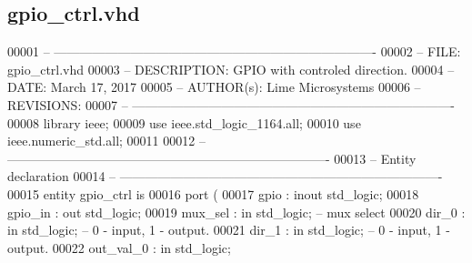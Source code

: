 \subsection{gpio\+\_\+ctrl.\+vhd}
\label{gpio__ctrl_8vhd_source}

\begin{DoxyCode}
00001 \textcolor{keyword}{-- ---------------------------------------------------------------------------- }
00002 \textcolor{keyword}{-- FILE:    gpio\_ctrl.vhd}
00003 \textcolor{keyword}{-- DESCRIPTION: GPIO with controled direction. }
00004 \textcolor{keyword}{-- DATE:    March 17, 2017}
00005 \textcolor{keyword}{-- AUTHOR(s):   Lime Microsystems}
00006 \textcolor{keyword}{-- REVISIONS:}
00007 \textcolor{keyword}{-- ---------------------------------------------------------------------------- }
00008 \textcolor{vhdlkeyword}{library }\textcolor{keywordflow}{ieee};
00009 \textcolor{vhdlkeyword}{use }ieee.std\_logic\_1164.\textcolor{keywordflow}{all};
00010 \textcolor{vhdlkeyword}{use }ieee.numeric\_std.\textcolor{keywordflow}{all};
00011 
00012 \textcolor{keyword}{-- ----------------------------------------------------------------------------}
00013 \textcolor{keyword}{-- Entity declaration}
00014 \textcolor{keyword}{-- ----------------------------------------------------------------------------}
00015 \textcolor{keywordflow}{entity }gpio_ctrl \textcolor{keywordflow}{is}
00016     \textcolor{keywordflow}{port} \textcolor{vhdlchar}{(}
00017         \textcolor{vhdlchar}{gpio}        \textcolor{vhdlchar}{:} \textcolor{keywordflow}{inout} \textcolor{comment}{std\_logic};
00018         \textcolor{vhdlchar}{gpio_in}     \textcolor{vhdlchar}{:} \textcolor{keywordflow}{out} \textcolor{comment}{std\_logic};
00019         \textcolor{vhdlchar}{mux_sel}     \textcolor{vhdlchar}{:} \textcolor{keywordflow}{in} \textcolor{comment}{std\_logic};\textcolor{keyword}{     -- mux select}
00020         \textcolor{vhdlchar}{dir_0}           \textcolor{vhdlchar}{:} \textcolor{keywordflow}{in} \textcolor{comment}{std\_logic};\textcolor{keyword}{     -- 0 - input, 1 - output.}
00021         \textcolor{vhdlchar}{dir_1}           \textcolor{vhdlchar}{:} \textcolor{keywordflow}{in} \textcolor{comment}{std\_logic};\textcolor{keyword}{     -- 0 - input, 1 - output.}
00022         \textcolor{vhdlchar}{out_val_0}   \textcolor{vhdlchar}{:} \textcolor{keywordflow}{in} \textcolor{comment}{std\_logic};

\end{DoxyCode}
